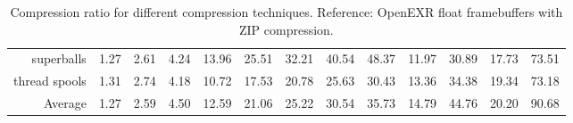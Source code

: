 \begin{landscape}
\begin{table}
\begin{tabularx}{\linewidth}{r | rr | rrrrrr | rrrr}
        superballs  & 1.27& 2.61& 4.24& 13.96& 25.51& 32.21& 40.54& 48.37& 11.97& 30.89& 17.73& 73.51\\
        thread spools  & 1.31& 2.74& 4.18& 10.72& 17.53& 20.78& 25.63& 30.43& 13.36& 34.38& 19.34& 73.18\\
        \midrule
        Average& 1.27& 2.59& 4.50& 12.59& 21.06& 25.22& 30.54& 35.73& 14.79& 44.76& 20.20& 90.68\\
        \bottomrule
    \end{tabularx}
    \caption{Compression ratio for different compression techniques. Reference: OpenEXR float framebuffers with ZIP compression.}
    \end{table}
\end{landscape}
